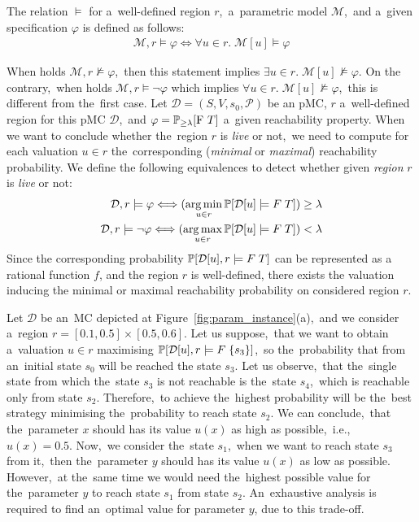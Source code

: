 \begin{definition}
The relation $\models$ for a~well-defined region $r$,~a~parametric model $\mathcal{M}$,~and a~given specification $\varphi$ is defined as follows:
\begin{align*}
    \mathcal{M}, r \models \varphi \Longleftrightarrow \forall u \in r. \; \mathcal{M}[u] \models \varphi
\end{align*}
\end{definition}
\noindent
When holds $\mathcal{M}, r \not\models \varphi$,~then this statement implies $\exists u \in r. \; \mathcal{M}[u] \not\models \varphi$.
On the contrary,~when holds $\mathcal{M}, r \models \neg\varphi$ which implies $\forall u \in r. \; \mathcal{M}[u] \not\models \varphi$,~this is different from the~first case.
Let $\mathcal{D} = (S, V, s_0, \mathcal{P})$ be an pMC, $r$ a~well-defined region for this pMC $\mathcal{D}$,~and $\varphi = \mathbb{P}_{\geq \lambda}[\mathrm{F}\ T]$ a~given reachability property.
When we want to conclude whether the~region $r$ is \textit{live} or not,~we need to compute for each valuation $u \in r$ the~corresponding (\textit{minimal} or \textit{maximal}) reachability probability.
We define the following equivalences to detect whether given \textit{region} $r$ is \textit{live} or not:
\begin{align*}
    \mathcal{D}, r \models \varphi \Longleftrightarrow (\operatorname*{arg\,min}_{u \in r} \mathbb{P}[\mathcal{D}[u] \models F \; T]) \geq \lambda \\
    \mathcal{D}, r \models \neg\varphi \Longleftrightarrow (\operatorname*{arg\,max}_{u \in r} \mathbb{P}[\mathcal{D}[u] \models F \; T]) < \lambda \\
\end{align*}
Since the corresponding probability $\mathbb{P}[\mathcal{D}[u], r \models F \; T]$ can be represented as a rational function $f$, and the region $r$ is well-defined, there exists the valuation inducing the minimal or maximal reachability probability on considered region $r$.

\begin{example}
Let $\mathcal{D}$ be an~MC depicted at Figure~\ref{fig:param_instance}(a),~and we  consider a~region $r = [0.1, 0.5] \times [0.5, 0.6]$.
Let us suppose,~that we want to obtain a~valuation $u \in r$ maximising $\mathbb{P}[\mathcal{D}[u], r \models F \; \{s_3 \}]$,~so the~probability that from an~initial state $s_0$ will be reached the state $s_3$.
Let us observe,~that the~single state from which the~state $s_3$ is not reachable is the~state $s_4$,~which is reachable only from state $s_2$.
Therefore,~to achieve the~highest probability will be the~best strategy minimising the~probability to reach state $s_2$.
We can conclude,~that the~parameter $x$ should has its value $u(x)$ as high as possible,~i.e.,~$u(x)= 0.5$.
Now,~we consider the~state $s_1$,~when we want to reach state $s_3$ from it,~then the~parameter $y$ should has its value $u(x)$ as low as possible.
However,~at the~same time we would need the~highest possible value for the~parameter $y$ to reach state $s_1$ from state $s_2$.
An~exhaustive analysis is required to find an~optimal value for parameter $y$, due to this trade-off.
\end{example}

